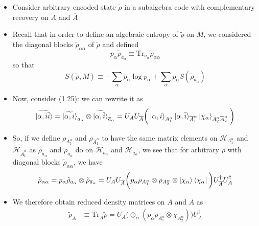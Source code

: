 \documentclass[12pt,a4paper]{article}
\numberwithin{equation}{section}
\newcommand{\ketbra}[2]{\ket{#1}\bra{#2}}
\newcommand{\ketbras}[1]{\ketbra{#1}{#1}}
\newcommand{\ol}[1]{\overline{#1}}
\theoremstyle{definition}
\theoremstyle{theorem}
\theoremstyle{example}
\begin{document}
	\begin{itemize}
		\item Consider arbitrary encoded state $\tilde{\rho}$ in a subalgebra code with complementary recovery on $A$ and $\ol{A}$
		\item Recall that in order to define an algebraic entropy of $\tilde{\rho}$ on $M$, we considered the diagonal blocks $\tilde{\rho}_{\alpha\alpha}$ of $\tilde{\rho}$ and defined
		\begin{equation}
			p_{\alpha}\tilde{\rho}_{a_{\alpha}}\equiv\text{Tr}_{\ol{a}_{\alpha}}\tilde{\rho}_{\alpha\alpha}
		\end{equation}
		so that
		\begin{equation}
			S(\tilde{\rho},M)\equiv-\sum_{\alpha}p_{\alpha}\log{p_{\alpha}}+\sum_{\alpha}p_{\alpha}S(\tilde{\rho}_{a_{\alpha}})
		\end{equation}
		\item Now, consider (1.25): we can rewrite it as
		\begin{equation}
			\ket{\widetilde{\alpha,i\ol{i}}}=\ket{\widetilde{\alpha,i}}_{a_{\alpha}}\otimes\ket{\widetilde{\alpha,\ol{i}}}_{\ol{a}_{\alpha}}=U_{A}U_{\ol{A}}\bigg(\ket{\alpha,i}_{A_{1}^{\alpha}}\ket{\alpha,\ol{i}}_{\ol{A}_{1}^{\alpha}}\ket{\chi_{\alpha}}_{A_{2}^{\alpha}\ol{A}_{2}^{\alpha}}\bigg)
		\end{equation}
		\item So, if we define $\rho_{A_{1}^{\alpha}}$ and $\rho_{\ol{A}_{1}^{\alpha}}$ to have the same matrix elements on $\mathcal{H}_{A_{1}^{\alpha}}$ and $\mathcal{H}_{\ol{A}_{1}^{\alpha}}$ as $\tilde{\rho}_{a_{\alpha}}$ and $\tilde{\rho}_{\ol{a}_{\alpha}}$ do on $\mathcal{H}_{a_{\alpha}}$ and $\mathcal{H}_{\ol{a}_{\alpha}}$, we see that for arbitrary $\tilde{\rho}$ with diagonal blocks $\tilde{\rho}_{\alpha\alpha}$, we have
		\begin{equation}
			\tilde{\rho}_{\alpha\alpha}=p_{\alpha}\tilde{\rho}_{a_{\alpha}}\otimes\tilde{\rho}_{\ol{a}_{\alpha}}=U_{A}U_{\ol{A}}\bigg(p_{\alpha}\rho_{A_{1}^{\alpha}}\otimes\rho_{A_{2}^{\alpha}}\otimes \ketbras{\chi_{\alpha}}\bigg)U_{\ol{A}}^{\dagger}U_{A}^{\dagger}
		\end{equation}
		\item We therefore obtain reduced density matrices on $A$ and $\ol{A}$ as
		\begin{equation}
			\begin{aligned}
				\tilde{\rho}_{A}&\equiv\text{Tr}_{\ol{A}}\tilde{\rho}=U_{A}\bigg(\oplus_{\alpha}(p_{\alpha}\rho_{A_{1}^{\alpha}}\otimes\chi_{A_{2}^{\alpha}})\bigg)U_{A}^{\dagger}\\

\end{aligned}
\end{equation}
\end{itemize}
\end{document}
